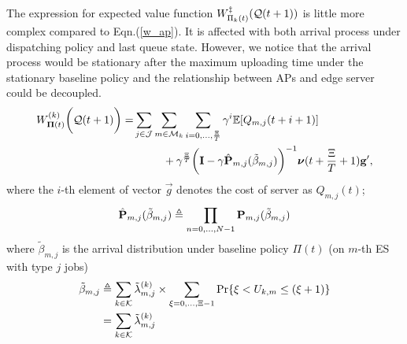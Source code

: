 The expression for expected value function $W^{\ddagger}_{\Pi_{k}(t)}(\mathcal{Q}(t+1))$ is little more complex compared to Eqn.(\ref{w_ap}).
It is affected with both arrival process under dispatching policy and last queue state.
However, we notice that the arrival process would be stationary after the maximum uploading time under the stationary baseline policy and the relationship between APs and edge server could be decoupled.
\begin{align}
    W^{(k)}_{\boldsymbol{\Pi}(t)}\bigg(\mathcal{Q}(t+1)\bigg)
    =& \sum_{j\in\mathcal{J}}\sum_{m\in\mathcal{M}_{k}}\sum_{i=0,\dots,\frac{\Xi}{T}} \gamma^{i} \mathbb{E}[ Q_{m,j}({t+i+1}) ]
    \nonumber\\
    &~~~~~~~~+ \gamma^{\frac{\Xi}{T}} \bigg( \mathbf{I} - \gamma \hat{\mathbf{P}}_{m,j}(\tilde{\beta}_{m,j}) \bigg)^{-1} \boldsymbol{\nu}({t+\frac{\Xi}{T}+1}) \mathbf{g}',
\end{align}
where the $i$-th element of vector $\vec{g}$ denotes the cost of server as $Q_{m,j}(t)$;
\begin{align}
    \hat{\mathbf{P}}_{m,j}(\tilde{\beta}_{m,j}) \triangleq \prod_{n=0,\dots,N-1} \mathbf{P}_{m,j}(\tilde{\beta}_{m,j})
\end{align}
where $\tilde{\beta}_{m,j}$ is the arrival distribution under baseline policy $\Pi(t)$ (on $m$-th ES with type $j$ jobs)
\begin{align}
    \tilde{\beta}_{m,j} &\triangleq \sum_{k\in\mathcal{K}} \tilde{\lambda}^{(k)}_{m,j} \times \sum_{\xi=0,\dots,\Xi-1} \Pr\{ \xi<U_{k,m}\leq(\xi+1) \}
        \nonumber\\
    ~~~~&= \sum_{k\in\mathcal{K}} \tilde{\lambda}^{(k)}_{m,j}
\end{align}

